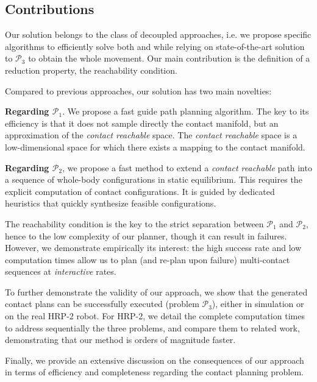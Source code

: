 \documentclass[journal]{IEEEtran}
\newcommand{\gls}[1]{\textit{#1}}
\providecommand{\DIFaddbegin}{\protect\color{blue}} %
\providecommand{\DIFaddend}{\protect\color{black}} %
\begin{document}
\subsection{Contributions}

Our solution belongs to the class of decoupled approaches, 
i.e. 
we
propose
specific
algorithms
to
efficiently
solve
both
\Pa
and \Pb
while 
relying 
on 
state-of-the-art 
solution 
to 
$\mathcal{P}_3$
to 
obtain
the
whole
movement.
Our
main
contribution
is
the
definition        
of
a reduction property, the reachability condition.

Compared to previous approaches, our solution has two main novelties: 

\noindent \textbf{Regarding $\mathcal{P}_1$}. We propose a fast guide path planning algorithm. The key to its efficiency is that it does not sample directly the contact manifold, but an approximation of the \textit{contact reachable} space. The \textit{contact reachable} space is a low-dimensional space for which there exists a mapping to the contact manifold.

\noindent \textbf{Regarding $\mathcal{P}_2$},  we propose a fast method to extend a \textit{contact reachable} path into a sequence of whole-body configurations in static equilibrium. This  requires the explicit computation of contact configurations. It is guided by dedicated heuristics that quickly synthesize feasible configurations.

The reachability condition is the key to the strict separation between $\mathcal{P}_1$ and $\mathcal{P}_2$, hence to the low complexity of our planner, though it
can result in failures. However, we demonstrate empirically its interest: the high success rate and low computation times allow us to plan (and re-plan upon failure) multi-contact sequences at \gls{interactive} rates.

To further demonstrate the validity of our approach, we show that the generated contact plans  can be successfully executed (problem  $\mathcal{P}_3$), either in simulation or on the real HRP-2 robot. For HRP-2, we detail the complete computation times to address sequentially the three problems, and compare them to related work, demonstrating that our method is orders of magnitude faster.

Finally, we provide an extensive discussion on the consequences of our approach in terms of efficiency and completeness regarding the contact planning problem. \DIFaddbegin \\
\DIFaddend 
\end{document}
